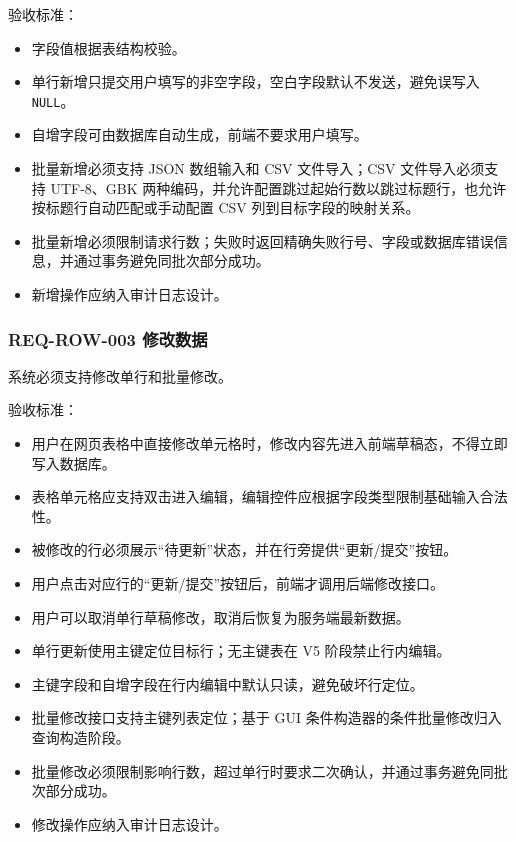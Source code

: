 \documentclass[
  a4paper,
  UTF8]{ctexart}
\providecommand{\tightlist}{%
  \setlength{\itemsep}{0pt}\setlength{\parskip}{0pt}}
\begin{document}
验收标准：

\begin{itemize}
\tightlist
\item
  字段值根据表结构校验。
\item
  单行新增只提交用户填写的非空字段，空白字段默认不发送，避免误写入
  \texttt{NULL}。
\item
  自增字段可由数据库自动生成，前端不要求用户填写。
\item
  批量新增必须支持 JSON 数组输入和 CSV 文件导入；CSV 文件导入必须支持
  UTF-8、GBK
  两种编码，并允许配置跳过起始行数以跳过标题行，也允许按标题行自动匹配或手动配置
  CSV 列到目标字段的映射关系。
\item
  批量新增必须限制请求行数；失败时返回精确失败行号、字段或数据库错误信息，并通过事务避免同批次部分成功。
\item
  新增操作应纳入审计日志设计。
\end{itemize}

\hypertarget{req-row-003-ux4feeux6539ux6570ux636e}{%
\subsubsection{REQ-ROW-003
修改数据}\label{req-row-003-ux4feeux6539ux6570ux636e}}

系统必须支持修改单行和批量修改。

验收标准：

\begin{itemize}
\tightlist
\item
  用户在网页表格中直接修改单元格时，修改内容先进入前端草稿态，不得立即写入数据库。
\item
  表格单元格应支持双击进入编辑，编辑控件应根据字段类型限制基础输入合法性。
\item
  被修改的行必须展示``待更新''状态，并在行旁提供``更新/提交''按钮。
\item
  用户点击对应行的``更新/提交''按钮后，前端才调用后端修改接口。
\item
  用户可以取消单行草稿修改，取消后恢复为服务端最新数据。
\item
  单行更新使用主键定位目标行；无主键表在 V5 阶段禁止行内编辑。
\item
  主键字段和自增字段在行内编辑中默认只读，避免破坏行定位。
\item
  批量修改接口支持主键列表定位；基于 GUI
  条件构造器的条件批量修改归入查询构造阶段。
\item
  批量修改必须限制影响行数，超过单行时要求二次确认，并通过事务避免同批次部分成功。
\item
  修改操作应纳入审计日志设计。
\end{itemize}
\end{document}
